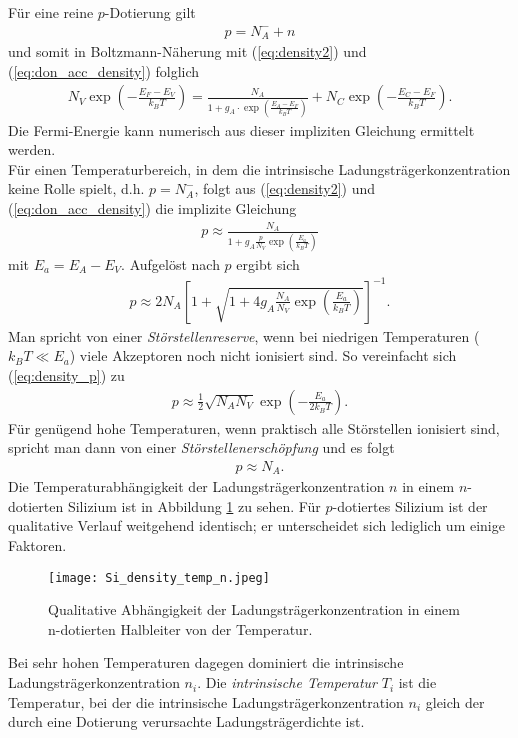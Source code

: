 Für eine reine $p$-Dotierung gilt
\begin{align}
p=N_A^{-}+n
\end{align}
und somit in Boltzmann-Näherung mit (\ref{eq:density2}) und (\ref{eq:don_acc_density}) folglich
\begin{align}
N_V\exp\left(-\frac{E_F-E_V}{k_B T}\right)=\frac{N_A}{1+g_A\cdot\exp\left(\frac{E_A-E_F}{k_B T}\right)}+N_C\exp\left(-\frac{E_C-E_F}{k_B T}\right).
\end{align}
Die Fermi-Energie kann numerisch aus dieser impliziten Gleichung ermittelt werden.\\
Für einen Temperaturbereich, in dem die intrinsische Ladungsträgerkonzentration keine Rolle spielt, d.h. $p=N_A^{-}$, folgt aus (\ref{eq:density2}) und (\ref{eq:don_acc_density}) die implizite Gleichung
\begin{align}
p\approx\frac{N_A}{1+g_A\frac{p}{N_V}\exp\left(\frac{E_a}{k_B T}\right)}
\end{align}
mit $E_a=E_A-E_V$. Aufgelöst nach $p$ ergibt sich
\begin{align}
p\approx 2N_A\left[1+\sqrt{1+4g_A\frac{N_A}{N_V}\exp\left(\frac{E_a}{k_B T}\right)}\right]^{-1}.
\label{eq:density_p}
\end{align}
Man spricht von einer \emph{Störstellenreserve}, wenn bei niedrigen Temperaturen ($k_B T\ll E_a$) viele Akzeptoren noch nicht ionisiert sind. So vereinfacht sich (\ref{eq:density_p}) zu
\begin{align}
p\approx \frac{1}{2}\sqrt{N_A N_V}\exp\left(-\frac{E_a}{2k_B T}\right).
\end{align}
Für genügend hohe Temperaturen, wenn praktisch alle Störstellen ionisiert sind, spricht man dann von einer \emph{Störstellenerschöpfung} und es folgt
\begin{align}
p\approx N_A.
\end{align}
Die Temperaturabhängigkeit der Ladungsträgerkonzentration $n$ in einem $n$-dotierten Silizium ist in Abbildung \ref{fig:si_density_temp} zu sehen. Für $p$-dotiertes Silizium ist der qualitative Verlauf weitgehend identisch; er unterscheidet sich lediglich um einige Faktoren.
\begin{figure}[p]
\centering
\texttt{[image: Si\_density\_temp\_n.jpeg]}
\caption{Qualitative Abhängigkeit der Ladungsträgerkonzentration in einem n-dotierten Halbleiter von der Temperatur. \cite{lit:GroMa14}}
\label{fig:si_density_temp}
\end{figure}
Bei sehr hohen Temperaturen dagegen dominiert die intrinsische Ladungsträgerkonzentration $n_i$. Die \emph{intrinsische Temperatur} $T_i$ ist die Temperatur, bei der die intrinsische Ladungsträgerkonzentration $n_i$ gleich der durch eine Dotierung verursachte Ladungsträgerdichte ist. %
